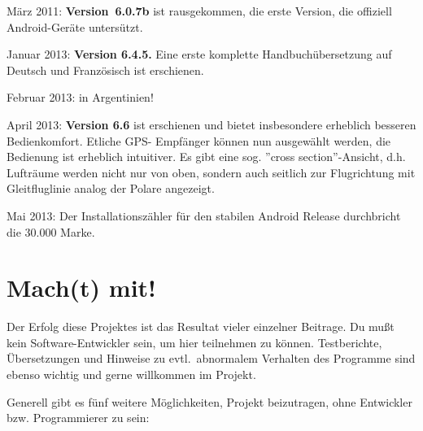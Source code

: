 März 2011: {\bf Version~6.0.7b} ist rausgekommen, die erste Version, die offiziell  Android-Geräte untersützt.

Januar 2013: {\bf Version 6.4.5.} Eine erste komplette Handbuchübersetzung auf Deutsch
und Französisch ist erschienen.

Februar 2013:  in Argentinien!

April 2013: {\bf Version 6.6} ist erschienen und bietet insbesondere erheblich besseren Bedienkomfort. Etliche GPS- Empfänger können  nun ausgewählt werden, die Bedienung ist erheblich intuitiver. 
Es gibt eine sog. ''cross section''-Ansicht, d.h. Lufträume werden nicht nur von oben, sondern auch seitlich zur Flugrichtung mit Gleitfluglinie analog der Polare angezeigt.

Mai 2013: Der Installationszähler für den stabilen Android \xc Release durchbricht 
die 30.000 Marke.


\section{Mach(t) mit!}

Der Erfolg diese Projektes ist das Resultat vieler einzelner Beitrage. Du mußt kein Software-Entwickler sein, um hier teilnehmen zu können.
Testberichte, Übersetzungen und Hinweise zu evtl.\ abnormalem Verhalten des Programme sind ebenso wichtig und gerne willkommen
im Projekt.

Generell gibt es fünf weitere Möglichkeiten, Projekt beizutragen, ohne Entwickler bzw. Programmierer zu sein:

